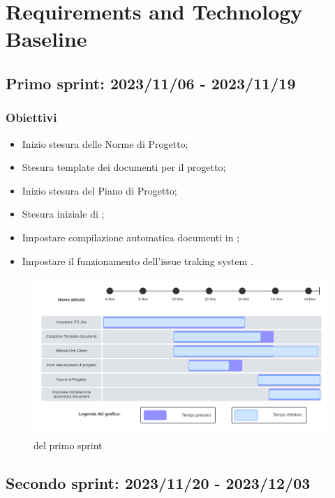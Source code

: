 \section{Requirements and Technology Baseline}
\label{pianificazione:\ccgloss{rtb}}

\subsection{Primo sprint: 2023/11/06 - 2023/11/19}
\subsubsection{Obiettivi}
\begin{itemize}[itemsep=-2pt]
    \item Inizio stesura delle Norme di Progetto;
    \item Stesura template dei documenti per il progetto;
    \item Inizio stesura del Piano di Progetto;
    \item Stesura iniziale di ;
    \item Impostare compilazione automatica documenti in ;
    \item Impostare il funzionamento dell'issue traking system .
\end{itemize}

\begin{figure}[h!]
    \centering  
    \includegraphics[width=\textwidth]{Roadmap1sprint.png}
    \caption{ del primo sprint}
    \label{fig:roadmap1s}
\end{figure}
\newpage

\subsection{Secondo sprint: 2023/11/20 - 2023/12/03}
